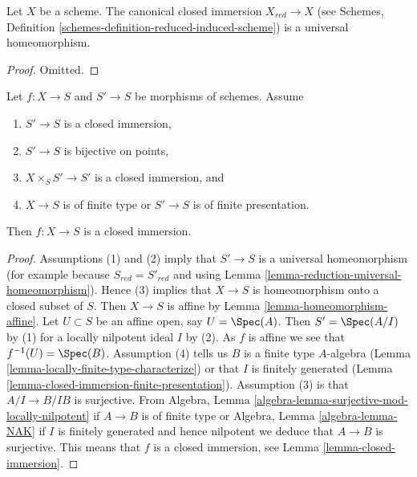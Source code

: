 \begin{lemma}
\label{lemma-reduction-universal-homeomorphism}
Let $X$ be a scheme. The canonical closed immersion $X_{red} \to X$ (see
Schemes, Definition \ref{schemes-definition-reduced-induced-scheme})
is a universal homeomorphism.
\end{lemma}

\begin{proof}
Omitted.
\end{proof}

\begin{lemma}
\label{lemma-check-closed-infinitesimally}
Let $f : X \to S$ and $S' \to S$ be morphisms of schemes.
Assume
\begin{enumerate}
\item $S' \to S$ is a closed immersion,
\item $S' \to S$ is bijective on points,
\item $X \times_S S' \to S'$ is a closed immersion, and
\item $X \to S$ is of finite type or $S' \to S$ is of finite presentation.
\end{enumerate}
Then $f : X \to S$ is a closed immersion.
\end{lemma}

\begin{proof}
Assumptions (1) and (2) imply that $S' \to S$ is a universal homeomorphism
(for example because $S_{red} = S'_{red}$ and using
Lemma \ref{lemma-reduction-universal-homeomorphism}).
Hence (3) implies that $X \to S$ is homeomorphism onto a
closed subset of $S$. Then $X \to S$ is affine by
Lemma \ref{lemma-homeomorphism-affine}.
Let $U \subset S$ be an affine open, say $U = \Spec(A)$. Then $S' = \Spec(A/I)$
by (1) for a locally nilpotent ideal $I$ by (2). As $f$ is affine we see that
$f^{-1}(U) = \Spec(B)$.
Assumption (4) tells us $B$ is a finite type $A$-algebra
(Lemma \ref{lemma-locally-finite-type-characterize}) or
that $I$ is finitely generated
(Lemma \ref{lemma-closed-immersion-finite-presentation}).
Assumption (3) is that $A/I \to B/IB$ is surjective. From
Algebra, Lemma \ref{algebra-lemma-surjective-mod-locally-nilpotent}
if $A \to B$ is of finite type
or Algebra, Lemma \ref{algebra-lemma-NAK} if $I$ is finitely generated
and hence nilpotent we deduce that $A \to B$ is surjective.
This means that $f$ is a closed immersion, see
Lemma \ref{lemma-closed-immersion}.
\end{proof}





